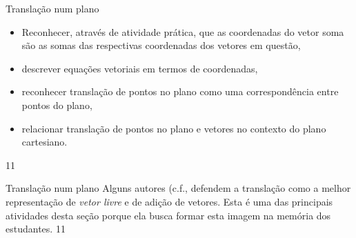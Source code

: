 \clearmargin
\begin{objectives}{Translação num plano}
{
\begin{itemize}
\item {} 
Reconhecer, através de atividade prática, que as coordenadas do vetor soma são as somas das respectivas coordenadas dos vetores em questão,

\item {} 
descrever equações vetoriais em termos de coordenadas,

\item {} 
reconhecer translação de pontos no plano como uma correspondência entre pontos do plano,

\item {} 
relacionar translação de pontos no plano e vetores no contexto do plano cartesiano.

\end{itemize}
}{1}{1}
\end{objectives}
\begin{sugestions}{Translação num plano}
{
Alguns autores (c.f., \citet{poynter2005} defendem a translação como a melhor representação de \textit{vetor livre} e de adição de vetores. Esta é uma das principais atividades desta seção porque ela busca formar esta imagem na memória dos estudantes.
}{1}{1}
\end{sugestions}
\clearmargin
